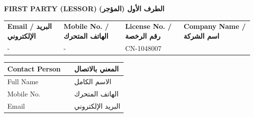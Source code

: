 \documentclass[10pt,a4paper]{article}
\begin{document}
\vspace{15pt}

\textbf{FIRST PARTY (LESSOR)} \hfill \textbf{الطرف الأول (المؤجر)}

\vspace{5pt}

\begin{tabular}{| L{4.5cm} | L{4.5cm} | L{4.5cm} | L{4.5cm} |}
  \hline
   \\
  \hline
  \hfil\textbf{Email / البريد الإلكتروني} & \hfil\textbf{Mobile No. / الهاتف المتحرك} & \hfil\textbf{License No. / رقم الرخصة} & \hfil\textbf{Company Name / اسم الشركة} \\
  \hline
  \hfil - & \hfil - & \hfil CN-1048007 & \hfil\color{BlueValue}{INTERNATIONAL CONSTRUCTION CONTRACTING - L.L.C} \\
  \hline
\end{tabular}

\vspace{10pt}

\begin{tabular}{| L{4.5cm} | L{10.0cm} | R{4.5cm} |}
  \hline
  \textbf{Contact Person} & & \textbf{المعني بالاتصال} \\
  \hline
  Full Name & \color{BlueValue}{SHINE PILLAI HARIDASAN PILLAI SANTHA KUMARI} & الاسم الكامل \\
  \hline
  Mobile No. & \color{BlueValue}{971588973810} & الهاتف المتحرك \\
  \hline
  Email & \color{BlueValue}{shinepillaihs@gmail.com} & البريد الإلكتروني \\
  \hline
\end{tabular}
\end{document}
